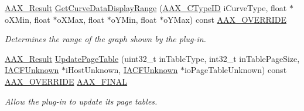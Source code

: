 \begin{Indent}
\begin{DoxyCompactItemize}
\mbox{\hyperlink{a00392_a4d8f69a697df7f70c3a8e9b8ee130d2f}{A\+A\+X\+\_\+\+Result}} \mbox{\hyperlink{a01481_af5a917a523f9117016a47227cc1a62f0}{Get\+Curve\+Data\+Display\+Range}} (\mbox{\hyperlink{a00392_ac678f9c1fbcc26315d209f71a147a175}{A\+A\+X\+\_\+\+C\+Type\+ID}} i\+Curve\+Type, float $\ast$o\+X\+Min, float $\ast$o\+X\+Max, float $\ast$o\+Y\+Min, float $\ast$o\+Y\+Max) const \mbox{\hyperlink{a00392_ac2f24a5172689ae684344abdcce55463}{A\+A\+X\+\_\+\+O\+V\+E\+R\+R\+I\+DE}}
\begin{DoxyCompactList}\small\item\em Determines the range of the graph shown by the plug-\/in. \end{DoxyCompactList}\item 
\mbox{\hyperlink{a00392_a4d8f69a697df7f70c3a8e9b8ee130d2f}{A\+A\+X\+\_\+\+Result}} \mbox{\hyperlink{a01481_a6a2a5cfe04b343f6ac47becb0e77ba84}{Update\+Page\+Table}} (uint32\+\_\+t in\+Table\+Type, int32\+\_\+t in\+Table\+Page\+Size, \mbox{\hyperlink{a01409}{I\+A\+C\+F\+Unknown}} $\ast$i\+Host\+Unknown, \mbox{\hyperlink{a01409}{I\+A\+C\+F\+Unknown}} $\ast$io\+Page\+Table\+Unknown) const \mbox{\hyperlink{a00392_ac2f24a5172689ae684344abdcce55463}{A\+A\+X\+\_\+\+O\+V\+E\+R\+R\+I\+DE}} \mbox{\hyperlink{a00392_aa4da4a09e940c332a2205e34e0677f40}{A\+A\+X\+\_\+\+F\+I\+N\+AL}}
\begin{DoxyCompactList}\small\item\em Allow the plug-\/in to update its page tables. \end{DoxyCompactList}\end{DoxyCompactItemize}
\end{Indent}
